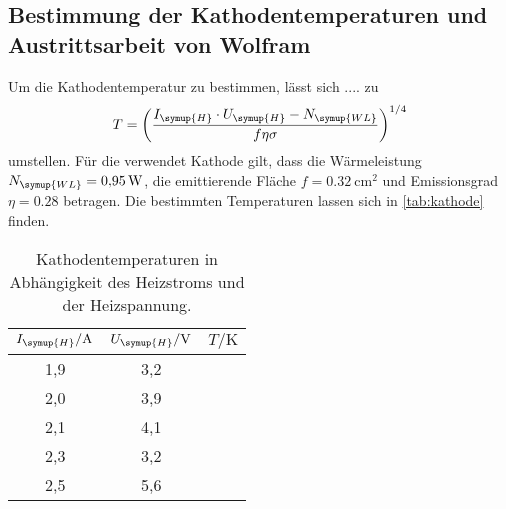 \subsection{Bestimmung der Kathodentemperaturen und Austrittsarbeit von Wolfram}
\label{sec:Wolfram}
Um die Kathodentemperatur zu bestimmen, lässt sich .... zu
\begin{equation*}
  T = \left(\frac{I_{\symup{H}}\cdot U_{\symup{H}}-N_{\symup{WL}}}{f\eta\sigma}\right)^{1/4}
\end{equation*}
umstellen. Für die verwendet Kathode gilt, dass die Wärmeleistung $N_{\symup{WL}}=\SI{0,95}{\watt}$, die
emittierende Fläche $f=\SI{0,32}{\centi\meter^2}$ und Emissionsgrad $\eta = 0.28$ betragen. Die bestimmten
Temperaturen lassen sich in \autoref{tab:kathode} finden.
\begin{table}
  \centering
  \caption{Kathodentemperaturen in Abhängigkeit des Heizstroms und der Heizspannung.}
  \label{tab:kathode}
  \begin{tabular}{c c c}
    \toprule
    $I_{\symup{H}}/\si{\ampere}$ & $U_{\symup{H}}/\si{\volt}$ & $T/\si{\kelvin}$ \\
    \midrule
    1,9 & 3,2 & \\
    2,0 & 3,9 & \\
    2,1 & 4,1 & \\
    2,3 & 3,2 & \\
    2,5 & 5,6 & \\
    \bottomrule
  \end{tabular}
\end{table}